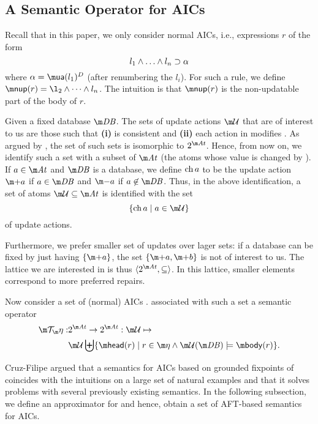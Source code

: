 \subsection{A Semantic Operator for AICs}
Recall that in this paper, we only consider normal AICs, i.e., expressions $r$ of the form 
\[ l_1\land \ldots \land l_n \supset \alpha\]
where $\alpha = \actof(l_1)^D$ (after renumbering the $l_i$).
For such a rule, we define $\nup(r) = \l_2\land \dots \land l_n$. The intuition is that $\nup(r)$ is the non-updatable part of the body of $r$. 

Given a fixed database $\db$.
The sets of update actions $\UU$ that are of interest to us are those such that \textbf{(i)} \UU is consistent and \textbf{(ii)} each action in \UU modifies \db. As argued by  \citet{corr/Cruz-Filipe16}, the set of such sets is isomorphic to $2^{\atoms}$. Hence, from now on, we identify such a set with a subset of $\atoms$ (the atoms whose value is changed by \UU). 
If $a\in \atoms$ and $\db$ is a database, we define $\operatorname{ch} a$ to be the update action $\add a$ if $a\in \db$ and $\remove a$ if $a\not \in \db$. 
Thus, in the above identification, a set  of atoms $\UU\subseteq \atoms$ is identified with the set 
\[\{\change a\mid a \in \UU \}\]
of update actions.

Furthermore, we prefer smaller set of updates over lager sets: if a database can be fixed by just having $\{\add a\}$, the set $\{\add a, \add b\}$ is not of interest to us. 
The lattice we are interested in is thus $\langle 2^{\atoms}, \subseteq\rangle$. 
In this lattice, smaller elements correspond to more preferred repairs. 


Now consider a set of (normal) AICs \aics. 
\citet{corr/Cruz-Filipe16} associated with such a set a semantic operator
\begin{align*}\Op: &2^{\atoms}\to  2^{\atoms}: \UU \mapsto  \\ &\UU \biguplus \{\head(r) \mid r\in\aics \land  \UU(\db)\models \body(r)\}.\end{align*}

Cruz-Filipe argued that a semantics for AICs based on grounded fixpoints of \Op coincides with the intuitions on a large set of natural examples and that it solves problems with several previously existing semantics. 
In the following subsection, we define an approximator for \Op and hence, obtain a set of AFT-based semantics for AICs. 


